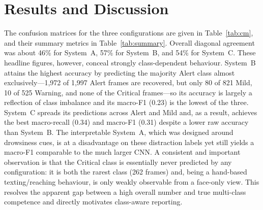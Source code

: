 \documentclass[conference]{IEEEtran}
\begin{document}
\section{Results and Discussion}
The confusion matrices for the three configurations are given in Table~\ref{tab:cm}, and their summary metrics in Table~\ref{tab:summary}. Overall diagonal agreement was about 46\% for System~A, 57\% for System~B, and 54\% for System~C. These headline figures, however, conceal strongly class-dependent behaviour. System~B attains the highest accuracy by predicting the majority Alert class almost exclusively---1{,}972 of 1{,}997 Alert frames are recovered, but only 80 of 821 Mild, 10 of 525 Warning, and none of the Critical frames---so its accuracy is largely a reflection of class imbalance and its macro-F1 (0.23) is the lowest of the three. System~C spreads its predictions across Alert and Mild and, as a result, achieves the best macro-recall (0.34) and macro-F1 (0.31) despite a lower raw accuracy than System~B. The interpretable System~A, which was designed around drowsiness cues, is at a disadvantage on these distraction labels yet still yields a macro-F1 comparable to the much larger CNN. A consistent and important observation is that the Critical class is essentially never predicted by any configuration: it is both the rarest class (262 frames) and, being a hand-based texting/reaching behaviour, is only weakly observable from a face-only view. This resolves the apparent gap between a high overall number and true multi-class competence and directly motivates class-aware reporting.
\end{document}
